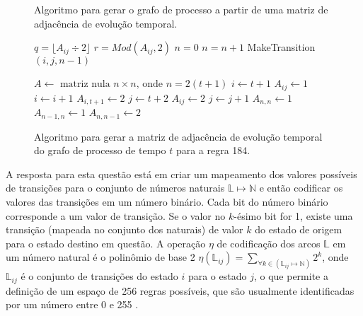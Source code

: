 \documentclass[a4,11pt]{article}
\begin{document}
\begin{figure}[H]
\begin{minipage}[t]{3.00in}
\begin{algorithm}[H]
\caption{Algoritmo para gerar o grafo de processo a partir de uma matriz de
adjacência de evolução temporal.}
\label{alg:mtos}
\begin{algorithmic}
            \REPEAT
                \STATE $q = \lfloor A_{ij} \div 2 \rfloor$
                \STATE $r = Mod(A_{ij},2)$
                    \STATE $n=0$
                        \STATE $n=n+1$
                    \ENDWHILE
                    \STATE MakeTransition$(i,j,n-1)$
                \ENDIF
        \ENDIF
    \ENDFOR
\ENDFOR
\end{algorithmic}
\end{algorithm}
\end{minipage}
\hfill
\begin{minipage}[t]{3.00in}
\begin{algorithm}[H]
\caption{Algoritmo para gerar a matriz de adjacência de evolução temporal do
grafo de processo de tempo $t$ para a regra 184.}
\label{alg:r184}
\begin{algorithmic}
\STATE $A \leftarrow \mbox{ matriz nula } n \times n \mbox{, onde } n=2(t+1)$
\STATE $i \leftarrow t+1$
    \STATE $A_{ij} \leftarrow 1$
    \STATE $i \leftarrow i+1$
\ENDFOR
{}
    \STATE $A_{i,t+1} \leftarrow 2$
\ENDFOR
\STATE $j \leftarrow t+2$
    \STATE $A_{ij} \leftarrow 2$
    \STATE $j \leftarrow j+1$
\ENDFOR
\STATE $A_{n,n} \leftarrow 1$
\STATE $A_{n-1,n} \leftarrow 1$
\STATE $A_{n,n-1} \leftarrow 2$
\end{algorithmic}
\end{algorithm}
\end{minipage}
\hfill
\end{figure}

A resposta para esta questão está em criar um mapeamento dos valores
possíveis de transições para o conjunto de números naturais
$\mathbb{L} \mapsto \mathbb{N}$ e então codificar os valores das transições
em um número binário. Cada bit do número binário corresponde a um valor de
transição. Se o valor no $k$-ésimo bit for 1, existe uma
transição (mapeada no conjunto dos naturais) de valor $k$ do estado de
origem para o estado destino em questão. A operação $\eta$ de codificação dos
arcos $\mathbb{L}$ em um número natural é o polinômio de base 2
$\eta(\mathbb{L}_{ij}) = \sum_{\forall k \in (\mathbb{L}_{ij} \mapsto \mathbb{N})} 2^k$,
onde $\mathbb{L}_{ij}$ é o conjunto de transições do estado $i$ para o estado $j$,
o que permite a definição de um espaço de 256 regras possíveis, que são usualmente
identificadas por um número entre 0 e 255 \cite{wolfram1984}.
\end{document}
